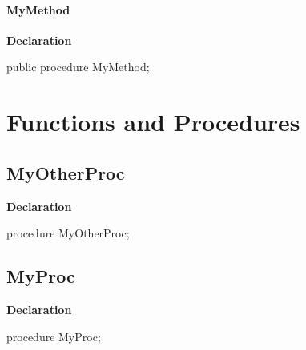 \documentclass{report}
\begin{document}
\paragraph*{MyMethod}\hspace*{\fill}

\begin{list}{}{
\setlength{\itemindent}{0cm}
\setlength{\listparindent}{0cm}
\setlength{\leftmargin}{\evensidemargin}
\addtolength{\leftmargin}{\tmplength}
\settowidth{\labelsep}{X}
\addtolength{\leftmargin}{\labelsep}
\setlength{\labelwidth}{\tmplength}
}
\begin{flushleft}
\item[\textbf{Declaration}\hfill]
\begin{ttfamily}
public procedure MyMethod;\end{ttfamily}


\end{flushleft}
\end{list}
\section{Functions and Procedures}
\subsection*{MyOtherProc}
\begin{list}{}{
\setlength{\itemindent}{0cm}
\setlength{\listparindent}{0cm}
\setlength{\leftmargin}{\evensidemargin}
\addtolength{\leftmargin}{\tmplength}
\settowidth{\labelsep}{X}
\addtolength{\leftmargin}{\labelsep}
\setlength{\labelwidth}{\tmplength}
}
\begin{flushleft}
\item[\textbf{Declaration}\hfill]
\begin{ttfamily}
procedure MyOtherProc;\end{ttfamily}


\end{flushleft}
\end{list}
\subsection*{MyProc}
\begin{list}{}{
\setlength{\itemindent}{0cm}
\setlength{\listparindent}{0cm}
\setlength{\leftmargin}{\evensidemargin}
\addtolength{\leftmargin}{\tmplength}
\settowidth{\labelsep}{X}
\addtolength{\leftmargin}{\labelsep}
\setlength{\labelwidth}{\tmplength}
}
\begin{flushleft}
\item[\textbf{Declaration}\hfill]
\begin{ttfamily}
procedure MyProc;\end{ttfamily}


\end{flushleft}
\end{list}
\end{document}

